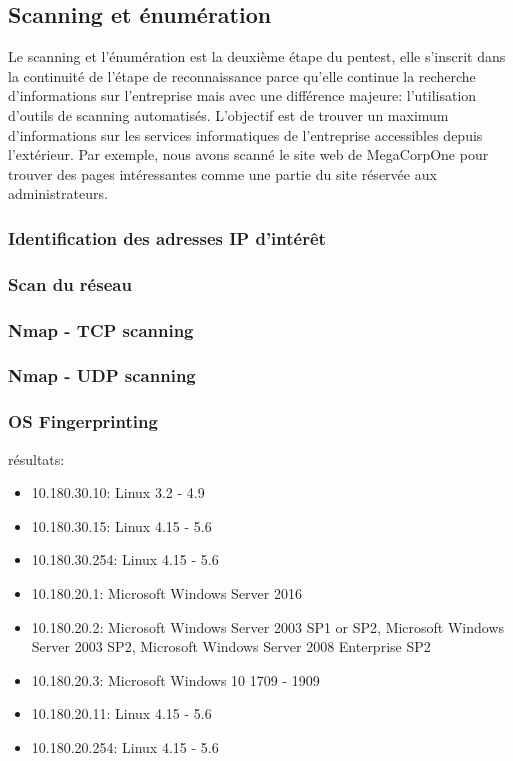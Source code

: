 \documentclass[french,oneside]{article}
\begin{document}
\subsection{Scanning et énumération}

Le scanning et l'énumération est la deuxième étape du pentest, elle s'inscrit dans la continuité de l'étape de reconnaissance parce qu'elle continue la recherche d'informations sur l'entreprise mais avec une différence majeure: l'utilisation d'outils de scanning automatisés. L'objectif est de trouver un maximum d'informations sur les services informatiques de l'entreprise accessibles depuis l'extérieur. Par exemple, nous avons scanné le site web de MegaCorpOne pour trouver des pages intéressantes comme une partie du site réservée aux administrateurs.



\subsubsection{Identification des adresses IP d'intérêt}



\subsubsection{Scan du réseau}



\subsubsection{Nmap - TCP scanning}



\subsubsection{Nmap - UDP scanning}



\subsubsection{OS Fingerprinting}

résultats:
\begin{itemize}
    \item 10.180.30.10:  Linux 3.2 - 4.9
    \item 10.180.30.15:  Linux 4.15 - 5.6
    \item 10.180.30.254: Linux 4.15 - 5.6
    \item 10.180.20.1:   Microsoft Windows Server 2016
    \item 10.180.20.2:   Microsoft Windows Server 2003 SP1 or SP2, Microsoft Windows Server 2003 SP2, Microsoft Windows Server 2008 Enterprise SP2
    \item 10.180.20.3:   Microsoft Windows 10 1709 - 1909
    \item 10.180.20.11:  Linux 4.15 - 5.6
    \item 10.180.20.254: Linux 4.15 - 5.6
\end{itemize}
\end{document}

